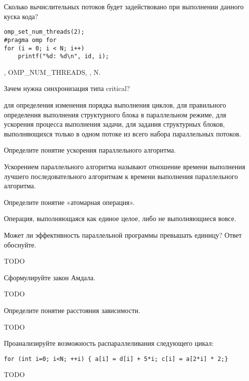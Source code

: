 \documentclass[a4paper, 12pt, addpoints]{exam}
\newcommand{\todo}{{\color{red}TODO}\ }
\begin{document}
\begin{questions}
\question[1] Сколько вычислительных потоков будет задействовано при выполнении данного куска кода?
\begin{lstlisting}
omp_set_num_threads(2);
#pragma omp for
for (i = 0; i < N; i++)
    printf("%d: %d\n", id, i);
\end{lstlisting}
\begin{choices}
    ,
    \choice OMP_NUM_THREADS,
    ,
    \choice N.
\end{choices}

\question[1] Зачем нужна синхронизация типа critical?
\begin{choices}
    \choice для определения изменения порядка выполнения циклов,
    \choice для правильного определения выполнения структурного блока в параллельном режиме,
    \choice для ускорения процесса выполнения задачи,
    \correctchoice для задания структурных блоков, выполняющихся только в одном потоке из всего набора параллельных потоков.
\end{choices}



\question[3] Определите понятие ускорения параллельного алгоритма.
\begin{solution}[2cm]
Ускорением  параллельного  алгоритма  называют  отношение времени  выполнения 
лучшего последовательного алгоритмам к времени выполнения параллельного
алгоритма.
\end{solution}

\question[3] Определите понятие «атомарная операция».
\begin{solution}[2cm]
Операция, выполняющаяся как единое целое, либо не выполняющиеся вовсе.
\end{solution}

\question[3] Может ли эффективность параллельной программы превышать единицу? Ответ обоснуйте.
\begin{solution}[2cm]
\todo
\end{solution}

\question[3] Сформулируйте закон Амдала.
\begin{solution}[2cm]
\todo
\end{solution}

\question[3] Определите понятие расстояния зависимости.
\begin{solution}[2cm]
\todo
\end{solution}

\question[3] Проанализируйте возможность распараллеливания следующего цикал:
\begin{lstlisting}
for (int i=0; i<N; ++i) { a[i] = d[i] + 5*i; c[i] = a[2*i] * 2;}
\end{lstlisting}
\begin{solution}[2cm]
\todo
\end{solution}


\end{questions}
\end{document}
